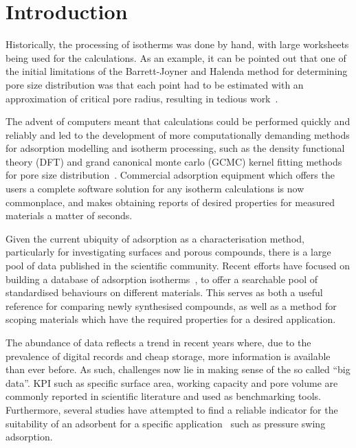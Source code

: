 
\section{Introduction}

Historically, the processing of isotherms was done by hand, with large
worksheets being used for the calculations. As an example,
it can be pointed out that one of the initial limitations of the
Barrett-Joyner and Halenda method for determining pore size distribution
was that each point had to be estimated with an approximation of critical
pore radius, resulting in tedious 
work~\cite{barrettDeterminationPoreVolume1951}.

The advent of computers meant that calculations could be performed
quickly and reliably and led to the development of more computationally
demanding methods for adsorption modelling and isotherm processing, such 
as the density functional theory (DFT) and grand canonical monte carlo 
(GCMC) kernel fitting methods for pore size 
distribution~\cite{seatonNewAnalysisMethod1989,%
	tarazonaPhaseEquilibriaFluid1987}.
Commercial adsorption equipment which offers the users
a complete software solution for any isotherm calculations is now
commonplace, and makes obtaining reports of desired properties
for measured materials a matter of seconds.

Given the current ubiquity of adsorption as a characterisation method,
particularly for investigating surfaces and porous compounds,
there is a large pool of data published in the scientific community.
Recent efforts have focused on building a database of adsorption
isotherms~\cite{sideriusNISTARPAEDatabase2015}, to offer a searchable
pool of standardised behaviours on different materials. This serves as
both a useful reference for comparing newly synthesised compounds, 
as well as a method for scoping materials which have the
required properties for a desired application.

The abundance of data reflects a trend in recent years where, due
to the prevalence of digital records and cheap storage, more
information is available than ever before. As such, challenges
now lie in making sense of the so called ``big data''.
\gls{KPI} such as specific surface area, working
capacity and pore volume are commonly reported in scientific literature
and used as benchmarking tools. Furthermore,
several studies have attempted to find a reliable indicator for
the suitability of an adsorbent for a specific
application~\cite{regeSimpleParameterSelecting2001, %
	ackley2000psa,%
	wiersumAdsorbentPerformanceIndicator2013} such as pressure swing
adsorption.

